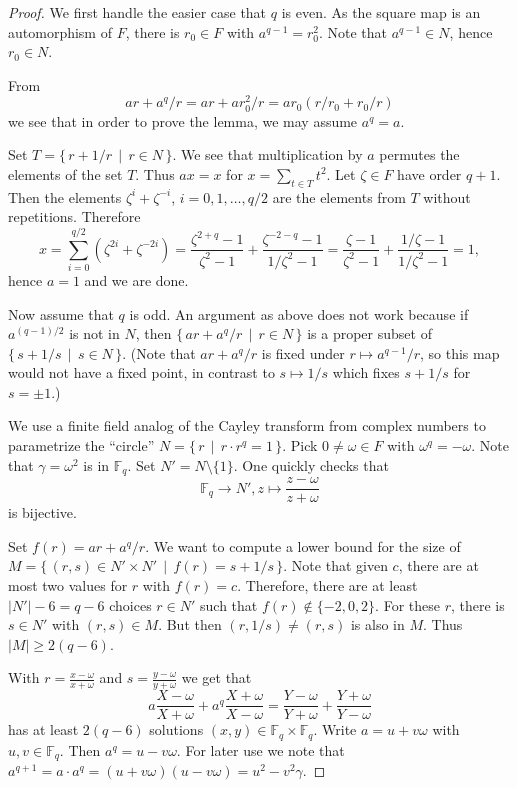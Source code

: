 \documentclass[12pt]{amsart}
\theoremstyle{plain}
\theoremstyle{definition}
\numberwithin{equation}{section}
\newcommand{\abs}[1]{\lvert#1\rvert}
\newcommand*{\set}[1]{\{#1\}}
\newcommand*{\defset}[2]{\{\,#1\,\mid\,#2\,\}}
\newcommand{\FF}{\mathbb F}
\begin{document}
\begin{proof} We first handle the easier case that $q$ is even.
As the square map is an automorphism of $F$, there is $r_0\in F$ with
$a^{q-1}=r_0^2$. Note that $a^{q-1}\in N$, hence $r_0\in N$.
  
From%
\[
  ar+a^q/r=ar+ar_0^2/r=ar_0(r/r_0+r_0/r)
\]
  we see that in order to prove the lemma, we may assume $a^q=a$.

  Set $T=\defset{r+1/r}{r\in N}$. We see that multiplication by $a$
  permutes the elements of the set $T$. Thus $ax=x$ for
  $x=\sum_{t\in T}t^2$. Let $\zeta\in F$ have order $q+1$. Then the
  elements $\zeta^i+\zeta^{-i}$, $i=0,1,\dots,q/2$ are the elements
  from $T$ without repetitions. Therefore
  \[
    x = \sum_{i=0}^{q/2}(\zeta^{2i}+\zeta^{-2i})%
    =
    \frac{\zeta^{2+q}-1}{\zeta^2-1}+\frac{\zeta^{-2-q}-1}{1/\zeta^2-1}%
    =\frac{\zeta-1}{\zeta^2-1}+\frac{1/\zeta-1}{1/\zeta^2-1}=1,
  \]
  hence $a=1$ and we are done.

  Now assume that $q$ is odd. An argument as above does not work
  because if $a^{(q-1)/2}$ is not in $N$, then
  $\defset{ar+a^q/r}{r\in N}$ is a proper subset of
  $\defset{s+1/s}{s\in N}$. (Note that $ar+a^q/r$ is fixed under
  $r\mapsto a^{q-1}/r$, so this map would not have a fixed point, in
  contrast to $s\mapsto 1/s$ which fixes $s+1/s$ for $s=\pm1$.)

  We use a finite field analog of the Cayley transform from complex
  numbers to parametrize the ``circle'' $N=\defset{r}{r\cdot r^q=1}$.
  Pick $0\ne\omega\in F$ with $\omega^q=-\omega$. Note that
  $\gamma=\omega^2$ is in $\FF_q$. Set $N'=N\setminus\set{1}$. One
  quickly checks that
  \[
    \FF_q\to N', z\mapsto\frac{z-\omega}{z+\omega}
  \]
  is bijective.

  Set $f(r)=ar+a^q/r$. We want to compute a lower bound for the size
  of $M=\defset{(r,s)\in N'\times N'}{f(r)=s+1/s}$. Note that given
  $c$, there are at most two values for $r$ with $f(r)=c$. Therefore,
  there are at least $\abs{N'}-6=q-6$ choices $r\in N'$ such that
  $f(r)\notin\set{-2, 0, 2}$. For these $r$, there is $s\in N'$ with
  $(r, s)\in M$. But then $(r,1/s)\ne(r,s)$ is also in $M$. Thus
  $\abs{M}\ge2(q-6)$.

  With $r=\frac{x-\omega}{x+\omega}$ and $s=\frac{y-\omega}{y+\omega}$
  we get that
  \[
    a\frac{X-\omega}{X+\omega} + a^q\frac{X+\omega}{X-\omega} =
    \frac{Y-\omega}{Y+\omega} + \frac{Y+\omega}{Y-\omega}
  \]
  has at least $2(q-6)$ solutions $(x,y)\in\FF_q\times\FF_q$. Write
  $a=u+v\omega$ with $u,v\in\FF_q$. Then $a^q=u-v\omega$. For later
  use we note that
  $a^{q+1}=a\cdot a^q=(u+v\omega)(u-v\omega)=u^2-v^2\gamma$.


\end{proof}
\end{document}
